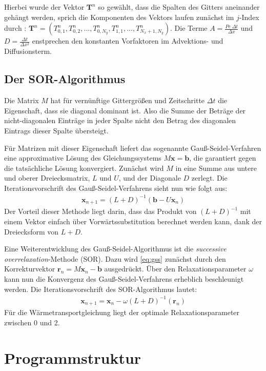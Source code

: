 Hierbei wurde der Vektor $\boldsymbol T^n$ so gewählt, dass die Spalten des Gitters aneinander gehängt werden, sprich die Komponenten des Vektors laufen zunächst im $j$-Index durch : $\boldsymbol T^n = \left( T^n_{0,1}, T^n_{0,2}, ..., T^n_{0,N_y}, T^n_{1,1},...,T^n_{N_x+1,N_y} \right)$.
Die Terme $A=\frac{Pe~\Delta t}{\Delta x}$ und $D=\frac{\Delta t}{\Delta x^2}$ enstprechen den konstanten Vorfaktoren im Advektions- und Diffusionsterm.

\newpage
\subsection{Der SOR-Algorithmus}
Die Matrix $M$ hat für vernünftige Gittergrößen und Zeitschritte $\Delta t$ die Eigenschaft, dass sie diagonal dominant ist. Also die Summe der Beträge der nicht-diagonalen Einträge in jeder Spalte nicht den Betrag des diagonalen Eintrags dieser Spalte übersteigt.

Für Matrizen mit dieser Eigenschaft liefert das sogenannte Gauß-Seidel-Verfahren eine approximative Lösung des Gleichungssystems $ M\boldsymbol x = \boldsymbol b$, die garantiert gegen die tatsächliche Lösung konvergiert.
Zunächst wird $M$ in eine Summe aus untere und oberer Dreiecksmatrix, $L$ und $U$, und der Diagonale $D$ zerlegt. Die Iterationsvorschrift des Gauß-Seidel-Verfahrens sieht nun wie folgt aus:
\begin{align}
  \boldsymbol x_{n+1} = (L+D)^{-1}(\boldsymbol b - U\boldsymbol x_{n}) \label{eq:gss}
\end{align}
Der Vorteil dieser Methode liegt darin, dass das Produkt von $(L+D)^{-1}$ mit einem Vektor einfach über Vorwärtssubstitution berechnet werden kann, dank der Dreiecksform von $L+D$.

Eine Weiterentwicklung des Gauß-Seidel-Algorithmus ist die \emph{successive overrelaxation}-Methode (SOR). Dazu wird \cref{eq:gss} zunächst durch den Korrekturvektor $\boldsymbol r_n = M\boldsymbol x_n -\boldsymbol b$ ausgedrückt.
Über den Relaxationsparameter $\omega$ kann nun die Konvergenz des Gauß-Seidel-Verfahrens erheblich beschleunigt werden.
Die Iterationsvorschrift des SOR-Algorithmus lautet:
\begin{align}
  \boldsymbol x_{n+1} = \boldsymbol x_n - \omega (L+D)^{-1}(\boldsymbol r_n) \label{eq:sor}
\end{align}
Für die Wärmetransportgleichung liegt der optimale Relaxationsparameter zwischen 0 und 2.

\newpage
\section{Programmstruktur}

